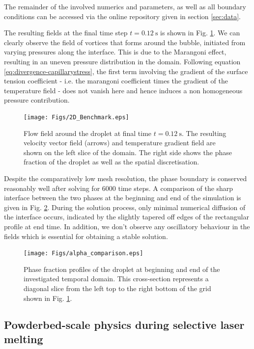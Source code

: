 \documentclass[conference,final,a4paper]{IEEEtran}
\begin{document}
The remainder of the involved numerics and parameters, as well as all boundary conditions can be accessed via the online repository given in section \ref{sec:data}.

The resulting fields at the final time step $t = \SI{0.12}{\second}$ is shown in Fig. \ref{fig:2d-benchmark}. We can clearly observe the field of vortices that forms around the bubble, initiated from varying pressures along the interface. This is due to the Marangoni effect, resulting in an uneven pressure distribution in the domain. Following equation \ref{eq:divergence-capillarystress}, the first term involving the gradient of the surface tension coefficient - i.e. the marangoni coefficient times the gradient of the temperature field - does not vanish here and hence induces a non homogeneous pressure contribution.

\begin{figure}[!tbp]
  \centering
  \texttt{[image: Figs/2D\_Benchmark.eps]}
  \caption{Flow field around the droplet at final time $t = \SI{0.12}{\second}$. The resulting velocity vector field (arrows) and temperature gradient field are shown on the left slice of the domain. The right side shows the phase fraction of the droplet as well as the spatial discretisation.}
  \label{fig:2d-benchmark}
\end{figure}

Despite the comparatively low mesh resolution, the phase boundary is conserved reasonably well after solving for 6000 time steps. A comparison of the sharp interface between the two phases at the beginning and end of the simulation is given in Fig. \ref{fig:alpha-comparison}. During the solution process, only minimal numerical diffusion of the interface occurs, indicated by the slightly tapered off edges of the rectangular profile at end time. In addition, we don't observe any oscillatory behaviour in the fields which is essential for obtaining a stable solution.

\begin{figure}[!tbp]
  \centering
  \texttt{[image: Figs/alpha\_comparison.eps]}
  \caption{Phase fraction profiles of the droplet at beginning and end of the investigated temporal domain. This cross-section represents a diagonal slice from the left top to the right bottom of the grid shown in Fig. \ref{fig:2d-benchmark}.}
  \label{fig:alpha-comparison}
\end{figure}

\subsection{Powderbed-scale physics during selective laser melting}\label{sec:lpbf}
\end{document}
